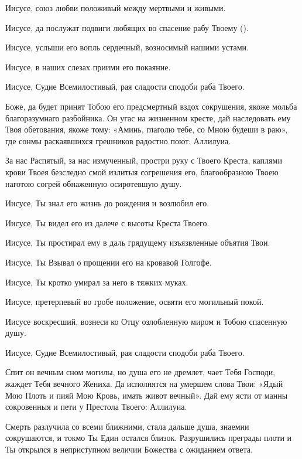 \begin{mymulticols}
Иисусе, союз любви положивый между мертвыми и живыми. 

Иисусе, да послужат подвиги любящих во спасение рабу Твоему (). 

Иисусе, услыши его вопль сердечный, возносимый нашими устами. 

Иисусе, в наших слезах приими его покаяние. 

Иисусе, Судие Всемилостивый, рая сладости сподоби раба Твоего.


Боже, да будет принят Тобою его предсмертный вздох сокрушения, якоже мольба благоразумнаго разбойника. Он угас на жизненном кресте, дай наследовать ему Твоя обетования, якоже тому: «Аминь, глаголю тебе, со Мною будеши в раю», где сонмы раскаявшихся грешников радостно поют: Аллилуиа.


За нас Распятый, за нас измученный, простри руку с Твоего Креста, каплями крови Твоея безследно смой излитыя согрешения его, благообразною Твоею наготою согрей обнаженную осиротевшую душу. 

Иисусе, Ты знал его жизнь до рождения и возлюбил его. 

Иисусе, Ты видел его из далече с высоты Креста Твоего. 

Иисусе, Ты простирал ему в даль грядущему изъязвленные объятия Твои. 

Иисусе, Ты Взывал о прощении его на кровавой Голгофе. 

Иисусе, Ты кротко умирал за него в тяжких муках. 

Иисусе, претерпевый во гробе положение, освяти его могильный покой. 

Иисусе воскресший, вознеси ко Отцу озлобленную миром и Тобою спасенную душу. 

Иисусе, Судие Всемилостивый, рая сладости сподоби раба Твоего.


Спит он вечным сном могилы, но душа его не дремлет, чает Тебя Господи, жаждет Тебя вечного Жениха. Да исполнятся на умершем слова Твои: «Ядый Мою Плоть и пияй Мою Кровь, имать живот вечный». Дай ему ясти от манны сокровенныя и пети у Престола Твоего: Аллилуиа.


Смерть разлучила со всеми ближними, стала дальше душа, знаемии сокрушаются, и токмо Ты Един остался близок. Разрушились преграды плоти и Ты открылся в неприступном величии Божества с ожиданием ответа. 


\end{mymulticols}
